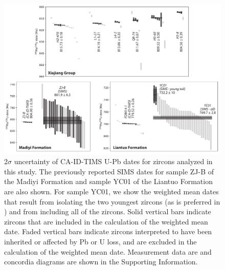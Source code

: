 \begin{figure}[h!]
    \centering
    \includegraphics[width=\textwidth]{figures/Xiajiang/zircons.pdf}
    \caption[2$\sigma$ uncertainty of CA-ID-TIMS U-Pb dates for zircons analyzed in this study.]{2$\sigma$ uncertainty of CA-ID-TIMS U-Pb dates for zircons analyzed in this study. The previously reported SIMS dates for sample ZJ-B of the Madiyi Formation \citep{Xian2020a} and sample YC01 of the Liantuo Formation \citep{Lan2015a} are also shown. For sample YC01, we show the weighted mean dates that result from isolating the two youngest zircons (as is preferred in \citealp{Lan2015a}) and from including all of the zircons. Solid vertical bars indicate zircons that are included in the calculation of the weighted mean date. Faded vertical bars indicate zircons interpreted to have been inherited or affected by Pb or U loss, and are excluded in the calculation of the weighted mean date. Measurement data are and concordia diagrams are shown in the Supporting Information.}
    \label{fig:zircons}
\end{figure}

